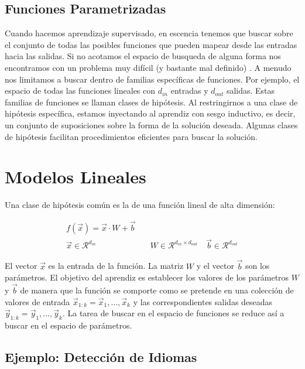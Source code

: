 


\subsection{Funciones Parametrizadas}

 Cuando hacemos aprendizaje supervisado, en escencia tenemos que buscar sobre el conjunto de todas las posibles funciones que pueden mapear desde las entradas hacia las salidas. Si no acotamos el espacio de busqueda de alguna forma nos encontramos con  un problema muy difícil (y bastante mal definido) \cite{goldberg2017neural}. A menudo nos limitamos a buscar dentro de familias específicas de funciones. Por ejemplo, el espacio de todas las funciones lineales con $d_{in}$ entradas y $d_{out}$ salidas. Estas familias de funciones se llaman clases de hipótesis. Al restringirnos a una clase de hipótesis específica, estamos inyectando al aprendiz con sesgo inductivo, es decir, un conjunto de suposiciones sobre la forma de la solución deseada. Algunas clases de hipótesis facilitan procedimientos eficientes para buscar la solución.

\section{Modelos Lineales}

Una clase de hipótesis común es la de una función lineal de alta dimensión:

\begin{equation}
\begin{split}
f(\vec{x}) = \vec{x} \cdot W + \vec{b}\\
\vec{x} \in  \mathcal{R}^{d_{in}} & \quad W \in  \mathcal{R}^{d_{in}\times d_{out}} \quad \vec{b} \in  \mathcal{R}^{d_{out}}
\end{split}
\end{equation}

El vector $\vec{x}$ es la entrada de la función. La matriz $W$ y el vector $\vec{b}$ son los parámetros. El objetivo del aprendiz es establecer los valores de los parámetros $W$ y $\vec{b}$ de manera que la función se comporte como se pretende en una colección de valores de entrada $\vec{x}_{1:k} = \vec{x}_1,\dots,\vec{x}_k$ y las correspondientes salidas deseadas $\vec{y}_{1:k} = \vec{y}_1,\dots,\vec{y}_k$. La tarea de buscar en el espacio de funciones se reduce así a buscar en el espacio de parámetros.

\subsection{Ejemplo: Detección de Idiomas}

